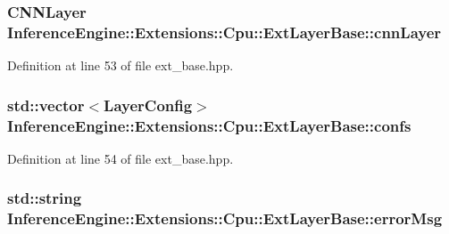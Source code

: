 \subsubsection[{\texorpdfstring{cnn\+Layer}{cnnLayer}}]{\setlength{\rightskip}{0pt plus 5cm}C\+N\+N\+Layer Inference\+Engine\+::\+Extensions\+::\+Cpu\+::\+Ext\+Layer\+Base\+::cnn\+Layer\hspace{0.3cm}{\ttfamily [protected]}}\hypertarget{classInferenceEngine_1_1Extensions_1_1Cpu_1_1ExtLayerBase_a1074cdccacb9e9ca6eec01bbc2f7ca4a}{}\label{classInferenceEngine_1_1Extensions_1_1Cpu_1_1ExtLayerBase_a1074cdccacb9e9ca6eec01bbc2f7ca4a}


Definition at line 53 of file ext\+\_\+base.\+hpp.

\subsubsection[{\texorpdfstring{confs}{confs}}]{\setlength{\rightskip}{0pt plus 5cm}std\+::vector$<$Layer\+Config$>$ Inference\+Engine\+::\+Extensions\+::\+Cpu\+::\+Ext\+Layer\+Base\+::confs\hspace{0.3cm}{\ttfamily [protected]}}\hypertarget{classInferenceEngine_1_1Extensions_1_1Cpu_1_1ExtLayerBase_a2a9f897007f2eb00e295cd25fd23fd5d}{}\label{classInferenceEngine_1_1Extensions_1_1Cpu_1_1ExtLayerBase_a2a9f897007f2eb00e295cd25fd23fd5d}


Definition at line 54 of file ext\+\_\+base.\+hpp.

\subsubsection[{\texorpdfstring{error\+Msg}{errorMsg}}]{\setlength{\rightskip}{0pt plus 5cm}std\+::string Inference\+Engine\+::\+Extensions\+::\+Cpu\+::\+Ext\+Layer\+Base\+::error\+Msg\hspace{0.3cm}{\ttfamily [protected]}}\hypertarget{classInferenceEngine_1_1Extensions_1_1Cpu_1_1ExtLayerBase_abc78e9b5a79fa339ffd831a5318f71f7}{}\label{classInferenceEngine_1_1Extensions_1_1Cpu_1_1ExtLayerBase_abc78e9b5a79fa339ffd831a5318f71f7}


